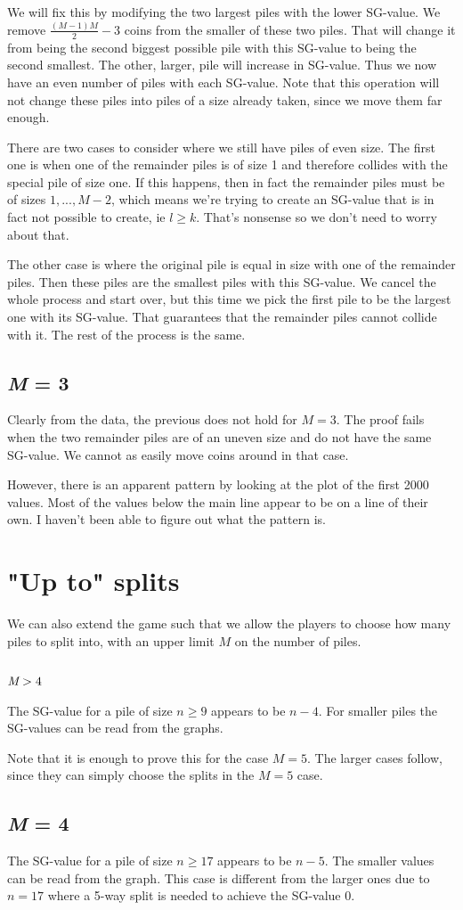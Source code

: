 \documentclass[english,a4paper,twoside]{amsart}
\theoremstyle{definition}
\begin{document}
We will fix this by modifying the two largest piles with the lower SG-value. We remove $\frac{(M-1)M}{2} - 3$
coins from the smaller of these two piles. That will change it from being the second biggest possible
pile with this SG-value to being the second smallest. The other, larger, pile will increase in SG-value.
Thus we now have an even number of piles with each SG-value. Note that this operation will not
change these piles into piles of a size already taken, since we move them far enough.

There are two cases to consider where we still have piles of even size. The first one is when one of the
remainder piles is of size 1 and therefore collides with the special pile of size one. If this happens,
then in fact the remainder piles must be of sizes $1, ..., M-2$, which means we're trying to create
an SG-value that is in fact not possible to create, ie $l \geq k$. That's nonsense so we don't need
to worry about that.

The other case is where the original pile is equal in size with one of the remainder piles. Then these
piles are the smallest piles with this SG-value. We cancel the whole process and start over, but this
time we pick the first pile to be the largest one with its SG-value. That guarantees that the remainder
piles cannot collide with it. The rest of the process is the same.

\subsection{\emph{M} = 3}
Clearly from the data, the previous does not hold for $M=3$. The proof fails when the two remainder
piles are of an uneven size and do not have the same SG-value. We cannot as easily move coins around
in that case.

However, there is an apparent pattern by looking at the plot of the first
2000 values. Most of the values below the main line appear to be on a line of their own. I haven't
been able to figure out what the pattern is.

\section{"Up to" splits}
We can also extend the game such that we allow the players to choose how many piles to split into,
with an upper limit $M$ on the number of piles.
\subsection{$\emph{M} > 4$}
The SG-value for a pile of size $n \geq 9$ appears to be $n-4$.
For smaller piles the SG-values can be read from the graphs.

Note that it is enough to prove this for the case $M = 5$. The larger cases follow, since they can
simply choose the splits in the $M=5$ case.
\subsection{\emph{M} = 4}
The SG-value for a pile of size $n\geq 17$ appears to be $n-5$.
The smaller values can be read from the graph.
This case is different from the larger ones due to $n=17$ where a 5-way split is needed to achieve
the SG-value 0.
\end{document}
